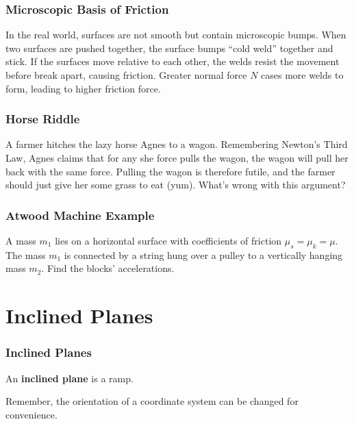 \documentclass[20pt]{beamer}
\begin{document}
\begin{frame}
	\frametitle{Microscopic Basis of Friction}
	In the real world, surfaces are not smooth but contain microscopic bumps.
	When two surfaces are pushed together, the surface bumps ``cold weld'' together and stick.
	If the surfaces move relative to each other, the welds resist the movement before break apart, causing friction.
	Greater normal force $N$ cases more welds to form, leading to higher friction force.
	\begin{figure}[ht]
		\centering
		\label{fig:microscopicfriction}
	\end{figure}
\end{frame}

\begin{frame}
	\frametitle{Horse Riddle}
	\begin{example}
		A farmer hitches the lazy horse Agnes to a wagon. Remembering Newton's Third Law, Agnes claims that for any she force pulls the wagon, the wagon will pull her back with the same force. Pulling the wagon is therefore futile, and the farmer should just give her some grass to eat (yum). What's wrong with this argument?
	\end{example}
\end{frame}

\begin{frame}
	\frametitle{Atwood Machine Example}
	\begin{example}
		A mass $m_1$ lies on a horizontal surface with coefficients of friction $\mu_s = \mu_k = \mu$. The mass $m_1$ is connected by a string hung over a pulley to a vertically hanging mass $m_2$. Find the blocks' accelerations.
		\begin{figure}[ht]
			\centering
			\label{fig:atwood2}
		\end{figure}
	\end{example}
\end{frame}

\section{Inclined Planes}

\begin{frame}
	\frametitle{Inclined Planes}
	\begin{definition}
		An \textbf{inclined plane} is a ramp.
	\end{definition}
	Remember, the orientation of a coordinate system can be changed for convenience.
	\begin{figure}[ht]
		\centering
		\label{fig:planeaxes}
	\end{figure}
\end{frame}
\end{document}
